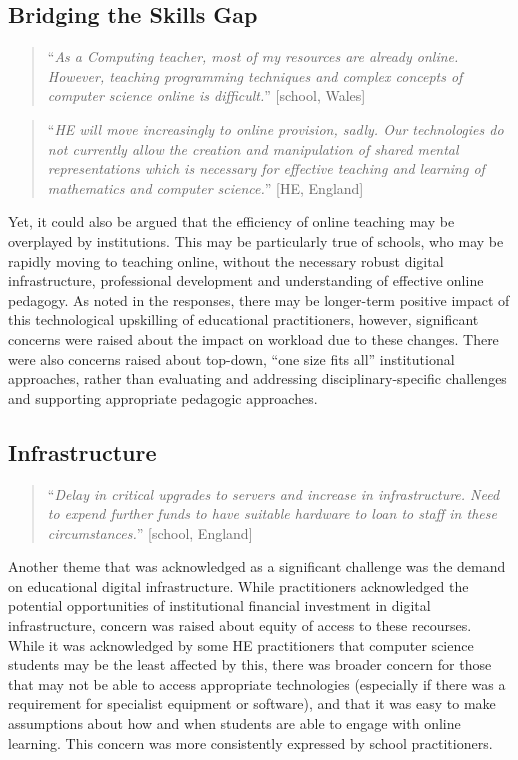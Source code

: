\documentclass[conference]{IEEEtran}
\begin{document}
\subsection{Bridging the Skills Gap}

\begin{quotation}
``{\emph{As a Computing teacher, most of my resources are already
online. However, teaching programming techniques and complex concepts
of computer science online is difficult.}}'' [school, Wales]
\end{quotation}

\begin{quotation}
``{\emph{HE will move increasingly to online provision, sadly. Our
technologies do not currently allow the creation and manipulation of
shared mental representations which is necessary for effective
teaching and learning of mathematics and computer science.}}'' [HE, England]
\end{quotation}

Yet, it could also be argued that the efficiency of online teaching
may be overplayed by institutions. This may be particularly true of
schools, who may be rapidly moving to teaching online, without the
necessary robust digital infrastructure, professional development and
understanding of effective online pedagogy. As noted in the responses,
there may be longer-term positive impact of this technological
upskilling of educational practitioners, however, significant concerns
were raised about the impact on workload due to these changes. There
were also concerns raised about top-down, ``one size fits all'' institutional
approaches, rather than evaluating and addressing
disciplinary-specific challenges and supporting appropriate pedagogic
approaches.

\subsection{Infrastructure}

\begin{quotation}
``{\emph{Delay in critical upgrades to servers and increase in
infrastructure.  Need to expend further funds to have suitable
hardware to loan to staff in these circumstances.}}'' [school, England]
\end{quotation}

Another theme that was acknowledged as a significant challenge was the
demand on educational digital infrastructure. While practitioners
acknowledged the potential opportunities of institutional financial
investment in digital infrastructure, concern was raised about equity
of access to these recourses. While it was acknowledged by some HE
practitioners that computer science students may be the least affected
by this, there was broader concern for those that may not be able to
access appropriate technologies (especially if there was a requirement
for specialist equipment or software), and that it was easy to make
assumptions about how and when students are able to engage with online
learning. This concern was more consistently expressed by school
practitioners.
\end{document}
